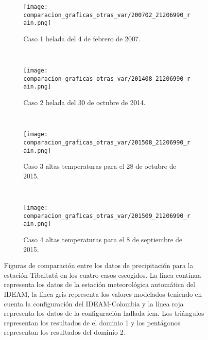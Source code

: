 
\begin{figure}[H]
    
\begin{subfigure}[normla]{0.4\textwidth}
\caption{Caso 1 helada del 4 de febrero de 2007.}
\label{caso1_tiba_wrf_prec}
\texttt{[image: comparacion\_graficas\_otras\_var/200702\_21206990\_rain.png]}
\end{subfigure}
~
\begin{subfigure}[normla]{0.4\textwidth}
\caption{Caso 2 helada del 30 de octubre de 2014.}
\label{caso2_tiba_wrf_prec}
\texttt{[image: comparacion\_graficas\_otras\_var/201408\_21206990\_rain.png]}
\end{subfigure}
~
\centering
\begin{subfigure}[normla]{0.4\textwidth}
\caption{Caso 3 altas temperaturas para el 28 de octubre de 2015.}
\label{caso3_tiba_wrf_prec}
\texttt{[image: comparacion\_graficas\_otras\_var/201508\_21206990\_rain.png]}
\end{subfigure}
~
\centering
\begin{subfigure}[normla]{0.4\textwidth}
\caption{Caso 4 altas temperaturas para el 8 de septiembre de 2015.}
\label{caso4_tiba_wrf_prec}
\texttt{[image: comparacion\_graficas\_otras\_var/201509\_21206990\_rain.png]}
\end{subfigure}

    \caption{Figuras de comparación entre los datos de precipitación para la estación Tibaitatá en los cuatro casos escogidos. La línea continua representa los datos de la estación meteorológica automática del IDEAM, la línea gris representa los valores modelados teniendo en cuenta la configuración del IDEAM-Colombia y la línea roja representa los datos de la configuración hallada icm. Los triángulos representan los resultados de el dominio 1 y los pentágonos representan los resultados del dominio 2.}
    \label{fig:wrf_prec_tibaitata}
\end{figure}


